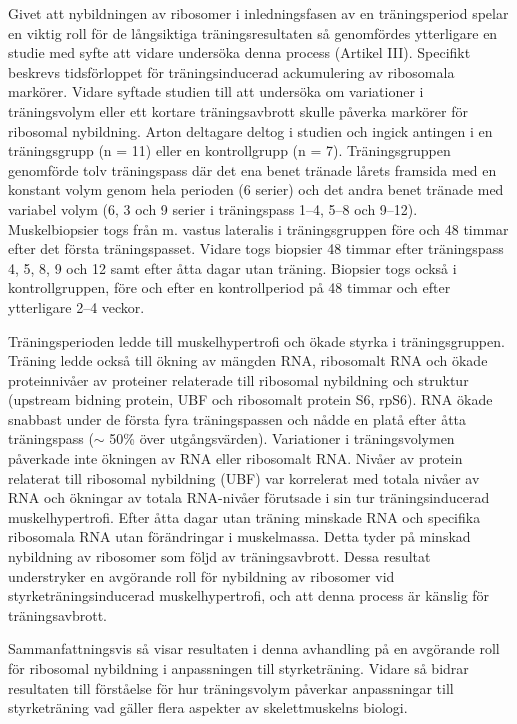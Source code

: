\documentclass[twoside,10pt]{gihclass} %
\begin{document}
Givet att nybildningen av ribosomer i inledningsfasen av en träningsperiod spelar en viktig roll för de långsiktiga träningsresultaten så genomfördes ytterligare en studie med syfte att vidare undersöka denna process (Artikel III). Specifikt beskrevs tidsförloppet för träningsinducerad ackumulering av ribosomala markörer. Vidare syftade studien till att undersöka om variationer i träningsvolym eller ett kortare träningsavbrott skulle påverka markörer för ribosomal nybildning.
Arton deltagare deltog i studien och ingick antingen i en träningsgrupp (n =
11) eller en kontrollgrupp (n = 7). Träningsgruppen genomförde tolv träningspass där det ena benet tränade lårets framsida med en konstant volym genom hela perioden (6 serier) och det andra benet tränade med variabel volym (6, 3 och 9 serier i träningspass 1--4, 5--8 och 9--12). Muskelbiopsier togs från m. vastus lateralis i träningsgruppen före och 48 timmar efter det första träningspasset. Vidare togs biopsier 48 timmar efter träningspass 4, 5, 8, 9 och 12 samt efter åtta dagar utan träning. Biopsier togs också i kontrollgruppen, före och efter en kontrollperiod på 48 timmar och efter ytterligare 2--4 veckor.

Träningsperioden ledde till muskelhypertrofi och ökade styrka i träningsgruppen.
Träning ledde också till ökning av mängden RNA, ribosomalt RNA och ökade proteinnivåer av proteiner relaterade till ribosomal nybildning och struktur (upstream bidning protein, UBF och ribosomalt protein S6, rpS6). RNA ökade snabbast under de första fyra träningspassen och nådde en platå efter åtta träningspass (\(\sim\) 50\% över utgångsvärden). Variationer i träningsvolymen påverkade inte ökningen av RNA eller ribosomalt RNA. Nivåer av protein relaterat till ribosomal nybildning (UBF) var korrelerat med totala nivåer av RNA och ökningar av totala RNA-nivåer förutsade i sin tur träningsinducerad muskelhypertrofi. Efter åtta dagar utan träning minskade RNA och specifika ribosomala RNA utan förändringar i muskelmassa. Detta tyder på minskad nybildning av ribosomer som följd av träningsavbrott. Dessa resultat understryker en avgörande roll för nybildning av ribosomer vid styrketräningsinducerad muskelhypertrofi, och att denna process är känslig för träningsavbrott.

Sammanfattningsvis så visar resultaten i denna avhandling på en avgörande roll för ribosomal nybildning i anpassningen till styrketräning. Vidare så bidrar resultaten till förståelse för hur träningsvolym påverkar anpassningar till styrketräning vad gäller flera aspekter av skelettmuskelns biologi.
\end{document}
